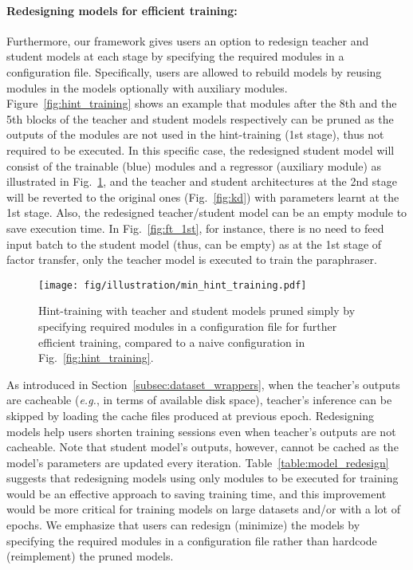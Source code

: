 \documentclass[runningheads]{llncs}
\begin{document}
\paragraph{Redesigning models for efficient training:}
Furthermore, our framework gives users an option to redesign teacher and student models at each stage by specifying the required modules in a configuration file.
Specifically, users are allowed to rebuild models by reusing modules in the models optionally with auxiliary modules.
Figure~\ref{fig:hint_training} shows an example that modules after the 8th and the 5th blocks of the teacher and student models respectively can be pruned as the outputs of the modules are not used in the hint-training (1st stage), thus not required to be executed.
In this specific case, the redesigned student model will consist of the trainable (blue) modules and a regressor (auxiliary module) as illustrated in Fig.~\ref{fig:min_hint_training}, and the teacher and student architectures at the 2nd stage will be reverted to the original ones (Fig.~\ref{fig:kd}) with parameters learnt at the 1st stage.
Also, the redesigned teacher/student model can be an empty module to save execution time.
In Fig.~\ref{fig:ft_1st}, for instance, there is no need to feed input batch to the student model (thus, can be empty) as at the 1st stage of factor transfer, only the teacher model is executed to train the paraphraser.

\begin{figure}[t]
    \centering
    \texttt{[image: fig/illustration/min\_hint\_training.pdf]}
    \caption{Hint-training with teacher and student models pruned simply by specifying required modules in a configuration file for further efficient training, compared to a naive configuration in Fig.~\ref{fig:hint_training}.}
    \label{fig:min_hint_training}
\end{figure}

As introduced in Section~\ref{subsec:dataset_wrappers}, when the teacher's outputs are cacheable (\emph{e.g.}, in terms of available disk space), teacher's inference can be skipped by loading the cache files produced at previous epoch.
Redesigning models help users shorten training sessions even when teacher's outputs are not cacheable.
Note that student model's outputs, however, cannot be cached as the model's parameters are updated every iteration.
Table~\ref{table:model_redesign} suggests that redesigning models using only modules to be executed for training would be an effective approach to saving training time, and this improvement would be more critical for training models on large datasets and/or with a lot of epochs.
We emphasize that users can redesign (minimize) the models by specifying the required modules in a configuration file rather than hardcode (reimplement) the pruned models.
\end{document}

